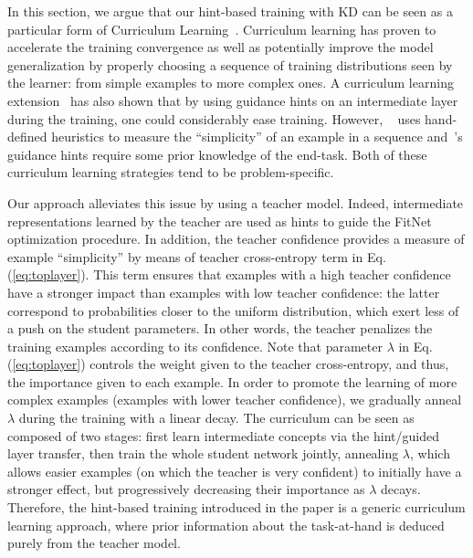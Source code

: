 \documentclass{article} %
\begin{document}
In this section, we argue that our hint-based training with KD can be seen as a particular form of Curriculum Learning~\citep{bengio.2009}.  Curriculum learning has proven to accelerate
the training convergence as well as potentially improve the model
generalization by properly choosing a sequence of training distributions seen by the
learner: from simple examples to more complex ones. A
curriculum learning extension~\citep{Gulcehre13} has also shown that by using
guidance hints on an intermediate layer during the training, one could considerably ease training.
  However, ~\cite{bengio.2009} uses hand-defined
heuristics to measure the ``simplicity'' of an example in a sequence and~\cite{Gulcehre13}'s guidance hints require some prior knowledge of the
end-task. Both of these curriculum learning strategies tend to be problem-specific.

Our approach alleviates this issue by using a teacher model.  Indeed,
intermediate representations learned by the teacher are used as hints to guide
the FitNet optimization procedure. In addition, the teacher confidence
provides a measure of example ``simplicity'' by means of teacher cross-entropy
term in Eq. (\ref{eq:toplayer}). This term ensures that examples with a high
teacher confidence have a stronger impact than examples with low teacher
confidence: the latter correspond to probabilities closer to the uniform distribution,
which exert less of a push on the student parameters. In other words,
the teacher penalizes the training examples
according to its confidence. Note that parameter $\lambda$ in
Eq. (\ref{eq:toplayer}) controls the weight given to the teacher
cross-entropy, and thus, the importance given to each example. In order to
promote the learning of more complex examples (examples with lower teacher
confidence), we gradually anneal $\lambda$ during the training with a linear
decay. The curriculum can be seen as composed of two stages: first
learn intermediate concepts via the hint/guided layer transfer, then train the whole
student network jointly, annealing 
$\lambda$, which allows easier examples (on which the teacher is very confident)
to initially have a stronger effect, but
progressively decreasing their importance as $\lambda$ decays.
Therefore, the hint-based training introduced in the paper is a
generic curriculum learning approach, where prior information about the task-at-hand is deduced
purely from the teacher model.
\end{document}
